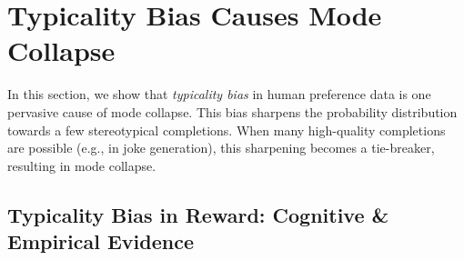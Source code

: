 
\section{Typicality Bias Causes Mode Collapse}
\label{sec:typicality}
%
%

In this section, we show that \emph{typicality bias} in human preference data is one pervasive cause of mode collapse. This bias sharpens the probability distribution towards a few stereotypical completions. When many high-quality completions are possible (e.g., in joke generation), this sharpening becomes a tie-breaker, resulting in mode collapse.





\subsection{Typicality Bias in Reward: Cognitive \& Empirical Evidence}
\label{sec:mc-typicality}


